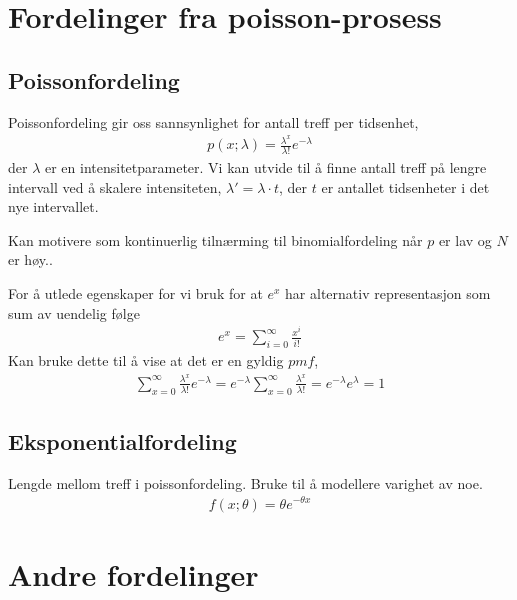 \section{Fordelinger fra poisson-prosess}
\subsection{Poissonfordeling}
Poissonfordeling gir oss sannsynlighet for antall treff per tidsenhet,
\begin{align}
p(x;\lambda) = \frac{\lambda^x}{\lambda!}e^{-\lambda}
\end{align}
der $\lambda$ er en intensitetparameter. Vi kan utvide til å finne antall treff på lengre intervall ved å skalere intensiteten, $\lambda'=\lambda\cdot t$, der $t$ er antallet tidsenheter i det nye intervallet. 

Kan motivere som kontinuerlig tilnærming til binomialfordeling når $p$ er lav og $N$ er høy.. 

For å utlede egenskaper for vi bruk for at $e^x$ har alternativ representasjon som sum av uendelig følge
\begin{align}
e^x=\sum_{i=0}^{\infty}\frac{x^i}{i!}
\end{align}
Kan bruke dette til å vise at det er en gyldig $pmf$,
\begin{align}
\sum_{x=0}^{\infty}\frac{\lambda^x}{\lambda!}e^{-\lambda} = e^{-\lambda}\sum_{x=0}^{\infty}\frac{\lambda^x}{\lambda!}=e^{-\lambda}e^{\lambda}=1
\end{align}
\subsection{Eksponentialfordeling}
Lengde mellom treff i poissonfordeling. Bruke til å modellere varighet av noe.
\begin{align}
f(x;\theta) = \theta e^{-\theta x}
\end{align}
\section{Andre fordelinger}
